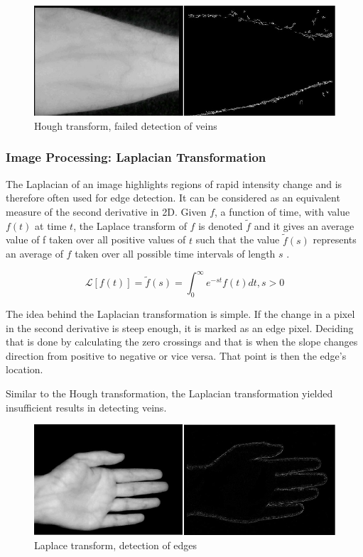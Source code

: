 \begin{figure}[H]
\centering
\includegraphics[scale=0.7]{figures/compare7.JPG}
\caption[Hough transform, failed detection of veins]{Hough transform, failed detection of veins}\label{fig:Compare7}
\end{figure}


\subsubsection{Image Processing: Laplacian Transformation}
The Laplacian of an image highlights regions of rapid intensity change and is therefore often used for edge detection. It can be considered as an equivalent measure of the second derivative in 2D.
Given $f$, a function of time, with value $f(t)$ at time $t$, the Laplace transform of $f$ is denoted $\widetilde {f} $ and it gives an average value of f taken over all positive values of $t$ such
that the value $\widetilde{f}(s)$ represents an average of $f$ taken over all possible time intervals of length $s$ \parencite{laplace}.

\begin{equation}
\mathcal{L}[f(t)]= \widetilde{f} (s) = \int_{0}^{\infty} e^{-st} f(t)dt,  s >0 
\end{equation}

The idea behind the Laplacian transformation is simple. If the change in a pixel in the second derivative is steep enough, it is marked as an edge pixel. Deciding that is done by calculating the zero crossings and that is when the slope changes direction from positive to negative or vice versa. That point is then the edge's location. 

Similar to the Hough transformation, the Laplacian transformation yielded insufficient results in detecting veins.



\begin{figure}[H]
\centering
\includegraphics[scale=0.7]{figures/compare8.JPG}
\caption[Laplace transform, detection of edges]{Laplace transform, detection of edges}\label{fig:Compare8}
\end{figure}

